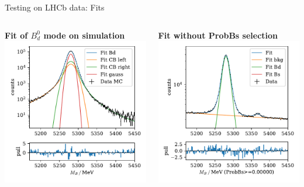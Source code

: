 \documentclass[aspectratio=1610, 10pt]{beamer}
\begin{document}
\begin{frame}{Testing on LHCb data: Fits}
  \begin{columns}
    \begin{column}{0.5\textwidth}
      \centering
      \textbf{Fit of $B^0_d$ mode on simulation}
      \includegraphics[width=\textwidth]{images/fit_mc.pdf}
    \end{column}
    \begin{column}{0.5\textwidth}
      \centering
      \textbf{Fit without ProbBs selection}
      \includegraphics[width=\textwidth]{images/backup/fit_baseline.pdf}
    \end{column}
  \end{columns}
\end{frame}
\end{document}
